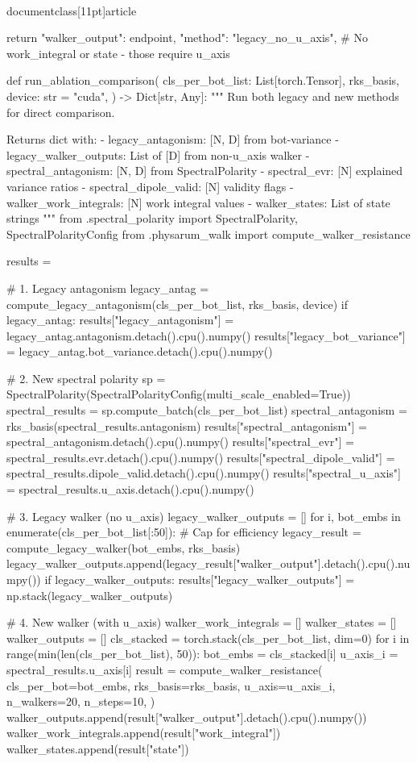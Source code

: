 \\documentclass[11pt]{article}
\begin{document}
\begin{CodeBlock}
    return {
        "walker_output": endpoint,
        "method": "legacy_no_u_axis",
        # No work_integral or state - those require u_axis
    }


def run_ablation_comparison(
    cls_per_bot_list: List[torch.Tensor],
    rks_basis,
    device: str = "cuda",
) -> Dict[str, Any]:
    """
    Run both legacy and new methods for direct comparison.

    Returns dict with:
        - legacy_antagonism: [N, D] from bot-variance
        - legacy_walker_outputs: List of [D] from non-u_axis walker
        - spectral_antagonism: [N, D] from SpectralPolarity
        - spectral_evr: [N] explained variance ratios
        - spectral_dipole_valid: [N] validity flags
        - walker_work_integrals: [N] work integral values
        - walker_states: List of state strings
    """
    from .spectral_polarity import SpectralPolarity, SpectralPolarityConfig
    from .physarum_walk import compute_walker_resistance

    results = {}

    # 1. Legacy antagonism
    legacy_antag = compute_legacy_antagonism(cls_per_bot_list, rks_basis, device)
    if legacy_antag:
        results["legacy_antagonism"] = legacy_antag.antagonism.detach().cpu().numpy()
        results["legacy_bot_variance"] = legacy_antag.bot_variance.detach().cpu().numpy()

    # 2. New spectral polarity
    sp = SpectralPolarity(SpectralPolarityConfig(multi_scale_enabled=True))
    spectral_results = sp.compute_batch(cls_per_bot_list)
    spectral_antagonism = rks_basis(spectral_results.antagonism)
    results["spectral_antagonism"] = spectral_antagonism.detach().cpu().numpy()
    results["spectral_evr"] = spectral_results.evr.detach().cpu().numpy()
    results["spectral_dipole_valid"] = spectral_results.dipole_valid.detach().cpu().numpy()
    results["spectral_u_axis"] = spectral_results.u_axis.detach().cpu().numpy()

    # 3. Legacy walker (no u_axis)
    legacy_walker_outputs = []
    for i, bot_embs in enumerate(cls_per_bot_list[:50]):  # Cap for efficiency
        legacy_result = compute_legacy_walker(bot_embs, rks_basis)
        legacy_walker_outputs.append(legacy_result["walker_output"].detach().cpu().numpy())
    if legacy_walker_outputs:
        results["legacy_walker_outputs"] = np.stack(legacy_walker_outputs)

    # 4. New walker (with u_axis)
    walker_work_integrals = []
    walker_states = []
    walker_outputs = []
    cls_stacked = torch.stack(cls_per_bot_list, dim=0)
    for i in range(min(len(cls_per_bot_list), 50)):
        bot_embs = cls_stacked[i]
        u_axis_i = spectral_results.u_axis[i]
        result = compute_walker_resistance(
            cls_per_bot=bot_embs,
            rks_basis=rks_basis,
            u_axis=u_axis_i,
            n_walkers=20,
            n_steps=10,
        )
        walker_outputs.append(result["walker_output"].detach().cpu().numpy())
        walker_work_integrals.append(result["work_integral"])
        walker_states.append(result["state"])


\end{CodeBlock}
\end{document}

